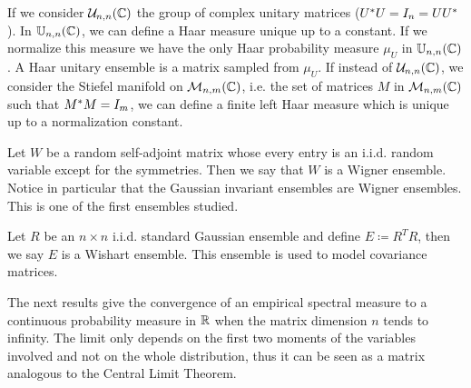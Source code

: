 \begin{example}
    If we consider $\mathcal U_{n,n}(\mathbb C)$ the group of complex unitary matrices ($U^*U = I_n = UU^*$). In $\mathbb U_{n,n}(\mathbb C)$, we can define a Haar measure unique up to a constant. If we normalize this measure we have the only Haar probability measure $\mu_U$ in $\mathbb U_{n,n}(\mathbb C)$. A Haar unitary ensemble is a matrix sampled from $\mu_U$. If instead of $\mathcal U_{n,n}(\mathbb C)$, we consider the Stiefel manifold on $\mathcal M_{n,m}(\mathbb C)$, i.e. the set of matrices $M$ in $\mathcal M_{n,m}(\mathbb C)$ such that $M^*M = I_{m}$, we can define a finite left Haar measure which is unique up to a normalization constant.
\end{example}

\begin{example}
    Let $W$ be a random self-adjoint matrix whose every entry is an i.i.d. random variable except for the symmetries. Then we say that $W$ is a Wigner ensemble. Notice in particular that the Gaussian invariant ensembles are Wigner ensembles. This is one of the first ensembles studied.
\end{example}

\begin{example}
    Let $R$ be an $n\times n$ i.i.d. standard Gaussian ensemble and define $E \coloneqq R^T R$, then we say $E$ is a Wishart ensemble. This ensemble is used to model covariance matrices. 
\end{example}



The next results give the convergence of an empirical spectral measure to a continuous probability measure in $\mathbb R$ when the matrix dimension $n$ tends to infinity. The limit only depends on the first two moments of the variables involved and not on the whole distribution, thus it can be seen as a matrix analogous to the Central Limit Theorem.

